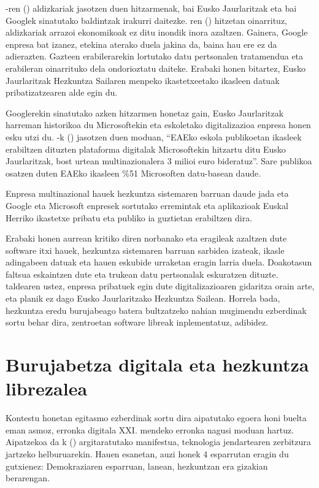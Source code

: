 \citeauthor{ej2022aldizkari}-ren (\citeyear{ej2022aldizkari}) aldizkariak jasotzen duen hitzarmenak, bai Eusko Jaurlaritzak eta bai Googlek sinatutako baldintzak irakurri daitezke. \citeauthor{apaolaza2022google}ren (\citeyear{apaolaza2022google}) hitzetan oinarrituz, aldizkariak arrazoi ekonomikoak ez ditu inondik inora azaltzen. Gainera, Google enpresa bat izanez, etekina aterako duela jakina da, baina hau ere ez da adierazten. Gazteen erabilerarekin lortutako datu pertsonalen tratamendua eta erabileran oinarrituko dela ondorioztatu daiteke. Erabaki honen bitartez, Eusko Jaurlaritzak Hezkuntza Sailaren menpeko ikastetxeetako ikasleen datuak pribatizatzearen alde egin du.

Googlerekin sinatutako azken hitzarmen honetaz gain, Eusko Jaurlaritzak harreman historikoa du Microsoftekin eta eskoletako digitalizazioa enpresa honen esku utzi du. \citeauthor{barcenilla2021gv}-k (\citeyear{barcenilla2021gv}) jasotzen duen moduan, “EAEko eskola publikoetan ikasleek erabiltzen dituzten plataforma digitalak Microsoftekin hitzartu ditu Eusko Jaurlaritzak, bost urtean multinazionalera 3 milioi euro bideratuz”. Sare publikoa osatzen duten EAEko ikasleen \%51 Microsoften datu-basean daude. 

Enpresa multinazional hauek hezkuntza sistemaren barruan daude jada eta Google eta Microsoft enpresek sortutako erremintak eta aplikazioak Euskal Herriko ikastetxe pribatu eta publiko ia guztietan erabiltzen dira.

Erabaki honen aurrean kritiko diren norbanako eta eragileak azaltzen dute software itxi hauek, hezkuntza sistemaren barruan sarbidea izateak, ikasle adingabeen datuak eta hauen eskubide urraketan eragin larria duela. Doakotasun faltsua eskaintzen dute eta trukean datu pertsonalak eskuratzen dituzte. \citeauthor{hl2019komunikatua} \citeyear{hl2019komunikatua} taldearen ustez, enpresa pribatuek egin dute digitalizazioaren gidaritza orain arte, eta planik ez dago Eusko Jaurlaritzako Hezkuntza Sailean. Horrela bada, hezkuntza eredu burujabeago batera bultzatzeko nahian mugimendu ezberdinak sortu behar dira, zentroetan software libreak inplementatuz, adibidez.

\section{Burujabetza digitala eta hezkuntza librezalea}\label{sec:burdig}

Kontestu honetan egitasmo ezberdinak sortu dira aipatutako egoera honi buelta eman asmoz, erronka digitala XXI. mendeko erronka nagusi moduan hartuz. Aipatzekoa da \citeauthor{ehd2021manifestua}k (\citeyear{ehd2021manifestua}) argitaratutako manifestua, teknologia jendartearen zerbitzura jartzeko helburuarekin. Hauen esanetan, auzi honek 4 esparrutan eragin du gutxienez: Demokraziaren esparruan, lanean, hezkuntzan era gizakian berarengan. 

